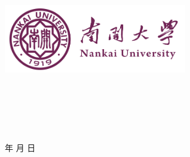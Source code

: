 \documentclass[a4paper,colorlinks=true,linkcolor=blue,urlcolor=blue,citecolor=green,bookmarks=true]{article}
\begin{document}
\renewcommand{\contentsname}{目录}
\renewcommand{\appendixname}{附录}
\renewcommand{\appendixpagename}{附录}
\renewcommand{\refname}{参考文献} 
\renewcommand{\figurename}{图}
\renewcommand{\tablename}{表}
\renewcommand{\abstractname}{摘要}
\renewcommand{\today}{\number\year 年 \number\month 月 \number\day 日}

\renewcommand {\thefigure}{\thesection{}.\arabic{figure}}%
\renewcommand{\figurename}{图}
\renewcommand{\contentsname}{目录}  

\begin{titlepage}
    \begin{center}
    \includegraphics[width=0.6\textwidth]{NKU.png}\\[1cm]
    \vspace{20mm}
		\textbf{\huge\textbf{}}\\[0.5cm]
		\textbf{\huge{}}\\[2.3cm]
		\textbf{\Huge\textbf{}}

		\vspace{\fill}
    
    \centering
    \textsc{\LARGE {}}\\[0.5cm]
    \textsc{\LARGE {}}\\[0.5cm]
    \textsc{\LARGE {}}\\[0.5cm]
    
    \vfill
    {\Large \today}
    \end{center}
\end{titlepage}
\end{document}
